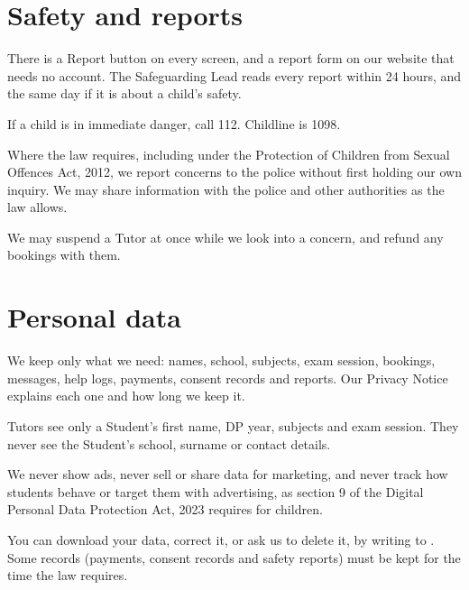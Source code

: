 \documentclass[11pt]{article}
\begin{document}
\section{Safety and reports}

\begin{clauses}
  \item There is a Report button on every screen, and a report form on our website that needs no account. The Safeguarding Lead reads every report within 24 hours, and the same day if it is about a child's safety.
  \item If a child is in immediate danger, call 112. Childline is 1098.
  \item Where the law requires, including under the Protection of Children from Sexual Offences Act, 2012, we report concerns to the police without first holding our own inquiry. We may share information with the police and other authorities as the law allows.
  \item We may suspend a Tutor at once while we look into a concern, and refund any bookings with them.
\end{clauses}

\section{Personal data}

\begin{clauses}
  \item We keep only what we need: names, school, subjects, exam session, bookings, messages, help logs, payments, consent records and reports. Our Privacy Notice explains each one and how long we keep it.
  \item Tutors see only a Student's first name, DP year, subjects and exam session. They never see the Student's school, surname or contact details.
  \item We never show ads, never sell or share data for marketing, and never track how students behave or target them with advertising, as section 9 of the Digital Personal Data Protection Act, 2023 requires for children.
  \item You can download your data, correct it, or ask us to delete it, by writing to . Some records (payments, consent records and safety reports) must be kept for the time the law requires.
\end{clauses}
\end{document}
